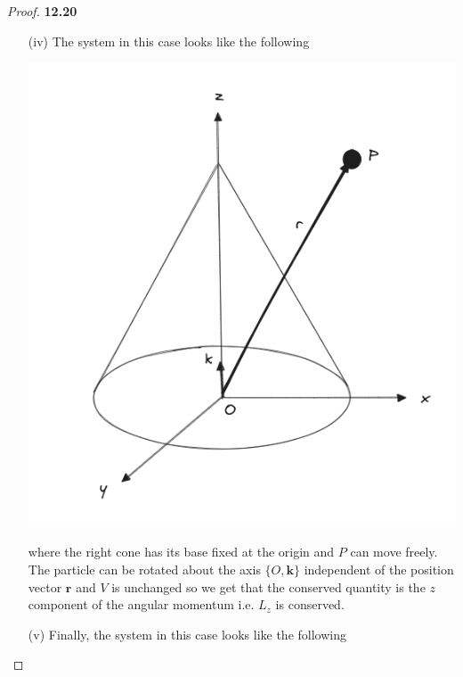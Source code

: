 \documentclass[11pt]{article}
\theoremstyle{definition}
\begin{document}
\begin{proof}{\textbf{12.20}}
\begin{itemize}
    \item [(iv)]
    The system in this case looks like the following
    \begin{center}
        \includegraphics[scale=0.4]{ch12-20-iv.png}
    \end{center}
    where the right cone has its base fixed at the origin and $P$ can move
    freely. The particle can be rotated about the axis $\{O,\bm{k}\}$
    independent of the position vector $\bm{r}$ and $V$ is unchanged so we get
    that the conserved quantity is the $z$ component of the angular momentum
    i.e. $L_z$ is conserved.
    \cleardoublepage
    \item [(v)]
    Finally, the system in this case looks like the following
    \begin{center}

\end{center}
\end{itemize}
\end{proof}
\end{document}
